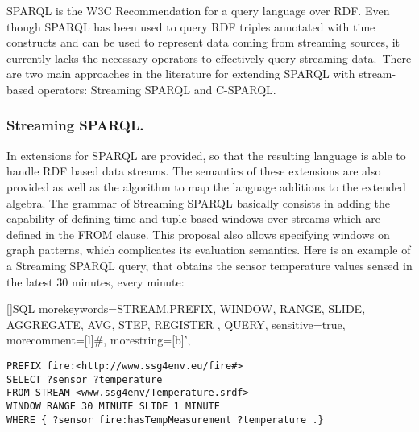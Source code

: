 SPARQL \cite{Prudhommeaux_2008} is the W3C Recommendation for a query language over RDF. Even though  SPARQL has been used to query RDF triples annotated with time constructs \cite{Barbieri_2010,Bolles_08} and can be used to represent data coming from streaming sources, it currently lacks the necessary operators to effectively query streaming data.\
There are two main approaches in the literature for extending SPARQL with stream-based operators: Streaming SPARQL and C-SPARQL.
\subsubsection{Streaming SPARQL.}
In \cite{Bolles_08} extensions for SPARQL are provided, so that the resulting language is able to handle RDF based data streams. The semantics of these extensions are also provided as well as the algorithm to map the language additions to the extended algebra. The grammar of Streaming SPARQL basically consists in adding the capability of defining time and tuple-based windows over streams which are defined in the \textsf{FROM} clause. %
This proposal also allows specifying windows on graph patterns, which complicates its evaluation semantics. %
Here is an example of a Streaming SPARQL query, that obtains the sensor temperature values sensed in the latest 30 minutes, every minute:

[]{SQL}{
morekeywords={STREAM,PREFIX, WINDOW, RANGE, SLIDE, AGGREGATE, AVG, STEP, REGISTER , QUERY},
sensitive=true,%
morecomment=[l]\#,%
morestring=[b]',%
}




\begin{lstlisting}[style=SPARQLSTRStyle,language=SPARQLSTR,frame=none]
PREFIX fire:<http://www.ssg4env.eu/fire#>
SELECT ?sensor ?temperature
FROM STREAM <www.ssg4env/Temperature.srdf>
WINDOW RANGE 30 MINUTE SLIDE 1 MINUTE
WHERE { ?sensor fire:hasTempMeasurement ?temperature .}
\end{lstlisting}

